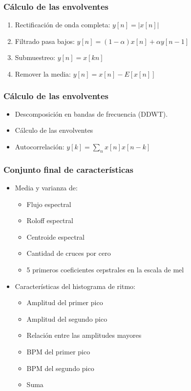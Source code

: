 \documentclass{beamer}
\begin{document}
\begin{frame}
\frametitle{Cálculo de las envolventes}
\begin{enumerate}
\item Rectificación de onda completa: $y[n] = |x[n]|$
\item Filtrado pasa bajos: $y[n] = (1-\alpha)x[n]+\alpha y[n-1]$
\item Submuestreo: $y[n]=x[kn]$
\item Remover la media: $y[n] = x[n] - E[x[n]]$
\end{enumerate}
\end{frame}

\begin{frame}
\frametitle{Cálculo de las envolventes}
\begin{itemize}
\item Descomposición en bandas de frecuencia (DDWT).
\item Cálculo de las envolventes
\item Autocorrelación: $y[k] = \sum_{n} x[n]x[n-k] $
\end{itemize}
\end{frame}

\begin{frame}
\frametitle{Conjunto final de características}
\begin{itemize}
\item Media y varianza de:
\begin{itemize}
\item Flujo espectral
\item Roloff espectral
\item Centroide espectral
\item Cantidad de cruces por cero
\item 5 primeros coeficientes cepstrales en la escala de mel
\end{itemize}
\item Características del histograma de ritmo:
\begin{itemize}
\item Amplitud del primer pico
\item Amplitud del segundo pico
\item Relación entre las amplitudes mayores
\item BPM del primer pico
\item BPM del segundo pico
\item Suma
\end{itemize}
\end{itemize}
\end{frame}
\end{document}
